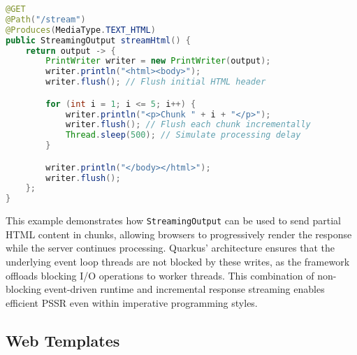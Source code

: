 \begin{lstlisting}[language=java,caption={Quarkus example using StreamingOutput for progressive HTML streaming}]
@GET
@Path("/stream")
@Produces(MediaType.TEXT_HTML)
public StreamingOutput streamHtml() {
    return output -> {
        PrintWriter writer = new PrintWriter(output);
        writer.println("<html><body>");
        writer.flush(); // Flush initial HTML header

        for (int i = 1; i <= 5; i++) {
            writer.println("<p>Chunk " + i + "</p>");
            writer.flush(); // Flush each chunk incrementally
            Thread.sleep(500); // Simulate processing delay
        }

        writer.println("</body></html>");
        writer.flush();
    };
}
\end{lstlisting}

This example demonstrates how \texttt{StreamingOutput} can be used to send
partial HTML content in chunks, allowing browsers to progressively render the
response while the server continues processing. Quarkus’ architecture ensures
that the underlying event loop threads are not blocked by these writes, as the
framework offloads blocking I/O operations to worker threads. This combination
of non-blocking event-driven runtime and incremental response streaming enables
efficient PSSR even within imperative programming styles.


\subsection{Web Templates}

